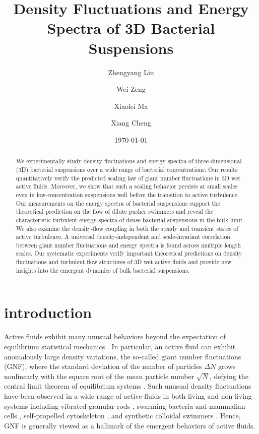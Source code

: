 \documentclass[twocolumn,aps,prx,amsmath,amssymb,longbibliography]{revtex4-2}
\begin{document}
\title{Density Fluctuations and Energy Spectra of 3D Bacterial Suspensions}

\author{Zhengyang Liu}
\author{Wei Zeng}
\author{Xiaolei Ma}
\author{Xiang Cheng}



\date{\today}


\begin{abstract}
We experimentally study density fluctuations and energy spectra of three-dimensional (3D) bacterial suspensions over a wide range of bacterial concentrations. Our results quantitatively verify the predicted scaling law of giant number fluctuations in 3D wet active fluids. Moreover, we show that such a scaling behavior persists at small scales even in low-concentration suspensions well before the transition to active turbulence. Our measurements on the energy spectra of bacterial suspensions support the theoretical prediction on the flow of dilute pusher swimmers and reveal the characteristic turbulent energy spectra of dense bacterial suspensions in the bulk limit. We also examine the density-flow coupling in both the steady and transient states of active turbulence. A universal density-independent and scale-invariant correlation between giant number fluctuations and energy spectra is found across multiple length scales. Our systematic experiments verify important theoretical predictions on density fluctuations and turbulent flow structures of 3D wet active fluids and provide new insights into the emergent dynamics of bulk bacterial suspensions.

\end{abstract}

\maketitle

\section{introduction}

Active fluids exhibit many unusual behaviors beyond the expectation of equilibrium statistical mechanics \cite{Ramaswamy2010,Cates2012,Marchetti2013,Poon2013,Elgeti2015}.
In particular, an active fluid can exhibit anomalously large density variations, the so-called giant number fluctuations (GNF), where the standard deviation of the number of particles $\Delta N$ grows nonlinearly with the square root of the mean particle number $\sqrt N$, defying the central limit theorem of equilibrium systems \cite{Mishin2015}.
Such unusual density fluctuations have been observed in a wide range of active fluids in both living and non-living systems including vibrated granular rods \cite{Narayan2007,Aranson2008,Kudrolli2008,Deseigne2010}, swarming bacteria \cite{Zhang2010,Nishiguchi2017} and mammalian cells \cite{Kawaguchi2017},
self-propelled cytoskeleton \cite{Schaller2013}, and synthetic colloidal swimmers \cite{Palacci2013,Karani2019}. Hence, GNF is generally viewed as a hallmark of the emergent behaviors of active fluids.
\end{document}
